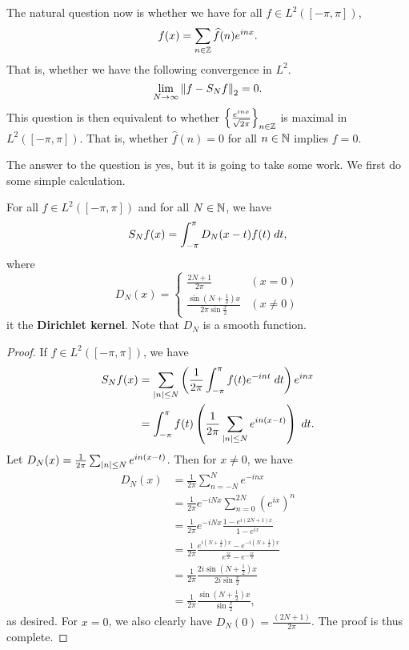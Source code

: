 \documentclass[a4paper]{article}
\begin{document}
The natural question now is whether we have for 
all $f \in L^2 ([-\pi, \pi])$, 
\[
f(x) = \sum_{n \in \mathbb{Z}} \widehat{f}(n) e^{i n x}.
\]
That is, whether we have the following convergence in $L^2$.
\[
\lim_{N \to \infty} \left\lVert f - S_N f\right\rVert_2 = 0.
\]
This question is then equivalent to whether 
$\left\{ \frac{e^{inx}}{\sqrt{2 \pi}} \right\}_{n \in \mathbb{Z}}$
is maximal in $L^2 ([-\pi, \pi])$. That is, 
whether $\hat{f}(n) = 0$ for all $n \in \mathbb{N}$ implies $f = 0$.

The answer to the question is yes, but it is going to take 
some work. We first do some simple calculation.

\begin{thm}
For all $f \in L^2([-\pi, \pi])$ and for all $N \in \mathbb{N}$, 
we have 
\[
S_N f(x) = \int_{- \pi}^\pi D_N(x - t) f(t) \; d t,
\]
where
\[
D_N(x) = \begin{cases}
  \frac{2N + 1}{2 \pi} & (x = 0) \\
  \frac{\sin \left( N + \frac{1}{2} \right) x}{2 \pi 
  \sin \frac{x}{2}} & (x \neq 0)
\end{cases}
\]
it the \textbf{Dirichlet kernel}. Note that 
$D_N$ is a smooth function.
\end{thm}

\begin{proof}
If $f \in L^2([- \pi, \pi])$, we have 
\[
\begin{aligned}
S_N f(x) 
&= \sum_{\left\lvert n\right\rvert \leq N} \left( \frac{1}{2\pi} 
\int_{- \pi}^\pi f(t) e^{- i n t} \; d t \right) e^{i n x} \\
&= \int_{-\pi}^\pi f(t) \left( \frac{1}{2\pi} 
\sum_{\left\lvert n\right\rvert \leq N} e^{i n (x - t)} \right) \; d t.
\end{aligned}
\]
Let $D_N(x) = \frac{1}{2\pi} 
\sum_{\left\lvert n\right\rvert \leq N} e^{i n (x - t)}$. 
Then for $x \neq 0$, we have 
\[
\begin{aligned}
  D_N(x) 
  &= \frac{1}{2\pi} \sum_{n=-N}^{N} 
  e^{- i n x} \\ 
  &= \frac{1}{2\pi} e^{- i N x} \sum_{n=0}^{2N}
  \left( e^{i x} \right)^n \\
  &= \frac{1}{2\pi} e^{- i N x} 
  \frac{1 - e^{i (2N+1) x}}{1 - e^{i x}} \\
  &= \frac{1}{2\pi} \frac{e^{i (N + \frac{1}{2}) x} 
  - e^{- i (N + \frac{1}{2}) x}}{e^{\frac{ix}{2}} - 
  e^{-\frac{ix}{2}}} \\
  &= \frac{1}{2\pi} \frac{2 i \sin (N + \frac{1}{2})x}
  {2i \sin \frac{x}{2}} \\
  &= \frac{1}{2\pi} \frac{\sin (N + \frac{1}{2})x}
  {\sin \frac{x}{2}},
\end{aligned}
\]
as desired. For $x = 0$, we also clearly have 
$D_N(0) = \frac{(2N+1)}{2\pi}$. The proof is thus 
complete.
\end{proof}
\end{document}
